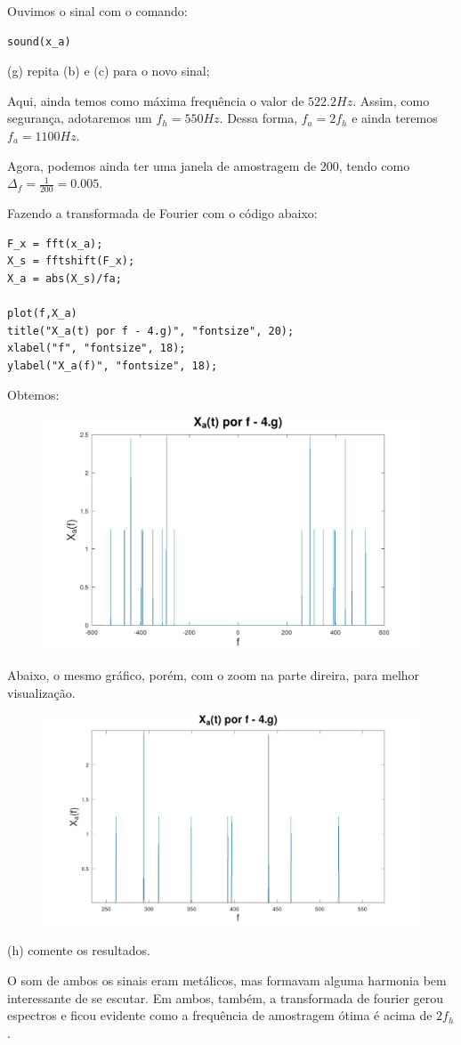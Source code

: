 \documentclass[10pt]{article}
\begin{document}
Ouvimos o sinal com o comando:
\begin{verbatim}
sound(x_a)
\end{verbatim}

(g) repita (b) e (c) para o novo sinal;

Aqui, ainda temos como máxima frequência o valor de $522.2 Hz$. Assim, como segurança, adotaremos um $f_h = 550 Hz$. Dessa forma, $f_a = 2f_h$ e ainda teremos $f_a = 1100 Hz$.

Agora, podemos ainda ter uma janela de amostragem de 200, tendo como $\Delta_f = \frac{1}{200} = 0.005$.

Fazendo a transformada de Fourier com o código abaixo:
\begin{verbatim}
F_x = fft(x_a);
X_s = fftshift(F_x);
X_a = abs(X_s)/fa;

plot(f,X_a)
title("X_a(t) por f - 4.g)", "fontsize", 20);
xlabel("f", "fontsize", 18);
ylabel("X_a(f)", "fontsize", 18);
\end{verbatim}

Obtemos:
\begin{figure}[h]
    \includegraphics[scale=0.3]{questao4f1.jpg}
    \centering
\end{figure}

\newpage

Abaixo, o mesmo gráfico, porém, com o zoom na parte direira, para melhor visualização.
\begin{figure}[h]
    \includegraphics[scale=0.3]{questao4f2.jpg}
    \centering    
\end{figure}

(h) comente os resultados.

O som de ambos os sinais eram metálicos, mas formavam alguma harmonia bem interessante de se escutar. Em ambos, também, a transformada de fourier gerou espectros e ficou evidente como a frequência de amostragem ótima é acima de $2f_h$.
\end{document}
